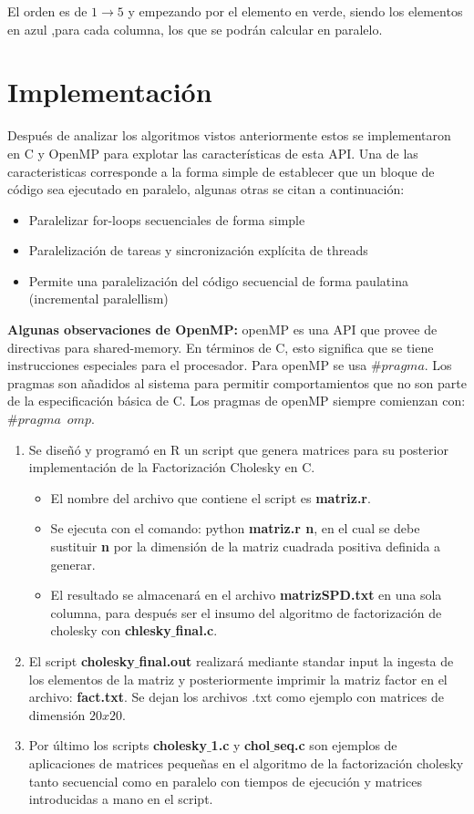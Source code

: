 \documentclass[10pt, oneside,spanish]{article}
\begin{document}
El orden es de $1 \to 5$ y empezando por el elemento en verde, siendo los elementos en azul ,para cada columna, los que se podrán calcular en paralelo. \cite{higham2009cholesky}

\section{Implementación}

Después de analizar los algoritmos vistos anteriormente estos se implementaron en C y OpenMP para explotar las características de esta API. Una de las caracteristicas corresponde a la forma simple de establecer que un bloque de código sea ejecutado en paralelo, algunas otras se citan a continuación:

\begin{itemize}
\item Paralelizar for-loops secuenciales de forma simple
\item Paralelización de tareas y sincronización explícita de threads
\item Permite una paralelización del código secuencial de forma paulatina (incremental paralellism)
\end{itemize}

\textbf{Algunas observaciones de OpenMP:} openMP es una API que provee de directivas para shared-memory. En términos de C, esto significa que se tiene instrucciones  especiales para el procesador. Para openMP se usa $\#pragma$. Los pragmas son añadidos al sistema para permitir comportamientos que no son parte de la especificación básica de C. Los pragmas de openMP siempre comienzan con: $\#pragma \enspace omp$.

\begin{enumerate}
\item Se diseñó y programó en R un script que genera matrices para su posterior implementación de la Factorización Cholesky en C.
	\begin{itemize}
	\item El nombre del archivo que contiene el script es \textbf{matriz.r}.
	\item Se ejecuta con el comando: python \textbf{matriz.r n}, en el cual se debe sustituir \textbf{n} por la dimensión de la matriz cuadrada positiva definida a generar.
	\item El resultado se almacenará en el archivo \textbf{matrizSPD.txt} en una sola columna, para después ser el insumo del algoritmo de factorización de cholesky con \textbf{chlesky$\_$final.c}.
	\end{itemize}
\item El script \textbf{cholesky$\_$final.out} realizará mediante standar input la ingesta de los elementos de la matriz y posteriormente imprimir la matriz factor en el archivo: \textbf{fact.txt}. Se dejan los archivos .txt como ejemplo con matrices de dimensión $20 x 20$. 
\item Por último los scripts \textbf{cholesky$\_$1.c} y \textbf{chol$\_$seq.c} son ejemplos de aplicaciones de matrices pequeñas en el algoritmo de la factorización cholesky tanto secuencial como en paralelo con tiempos de ejecución y matrices introducidas a mano en el script.
\end{enumerate}
\end{document}
